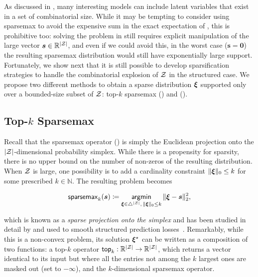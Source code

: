 As discussed in , many interesting models
can include latent variables that exist in a set of combinatorial
size. While it may be tempting to consider using sparsemax to avoid
the expensive sum in the exact expectation of , this
is prohibitive too: solving the problem in 
still requires explicit manipulation of the large vector $\bm{s} \in
    \mathbb{R}^{|\mathcal{Z}|}$, and even if we could avoid this, in the worst
case ($\bm{s}=\bm{0}$) the resulting sparsemax distribution would
still have exponentially large support. Fortunately, we show next
that it is still possible to develop sparsification strategies to
handle the combinatorial explosion of $\mathcal{Z}$ in the structured case.
We propose two different methods to obtain a sparse distribution
$\bm{\xi}$ supported only over a bounded-size subset of $\mathcal{Z}$: top-$k$
sparsemax () and \smap ().

\subsection{\label{sec:topksparse}\texorpdfstring{Top-{\boldmath $k$}}{Top-k} Sparsemax}

Recall that the sparsemax operator () is simply
the Euclidean projection onto the $|\mathcal{Z}|$-dimensional probability
simplex. While there is a propensity for sparsity, there is no upper
bound on the number of non-zeros of the resulting distribution. When
$\mathcal{Z}$ is large, one possibility is to add a cardinality constraint
$\|\bm{\xi}\|_0 \le k$ for some prescribed $k \in \mathbb{N}$. The
resulting problem becomes

\begin{equation}\label{eq:topk_sparsemax}
    \operatorname{\mathsf{sparsemax}_\text{$k$}}(\bm{s}) \coloneqq
    \operatorname*{\mathsf{argmin}}_{\bm{\xi} \in \triangle^{|\mathcal{Z}|}, \, \|\bm{\xi}\|_0 \le k} \| \bm{\xi} - \bm{s} \|_2^2,
\end{equation}

which is known as a \emph{sparse projection onto the simplex} and has
been studied in detail by \citet{kyrillidis2013sparse} and used to
smooth structured prediction
losses~\citep{NIPS2018_7726,blondel2020}. Remarkably, while this is a
non-convex problem, its solution $\bm{\xi}^\star$ can be written as a
composition of two functions: a top-$k$ operator $\operatorname{\mathsf{top}_\text{$k$}}:
    \mathbb{R}^{|\mathcal{Z}|} \rightarrow \mathbb{R}^{|\mathcal{Z}|}$, which returns a
vector identical to its input but where all the entries not among the
$k$ largest ones are masked out (set to $-\infty$), and the
$k$-dimensional sparsemax operator.

